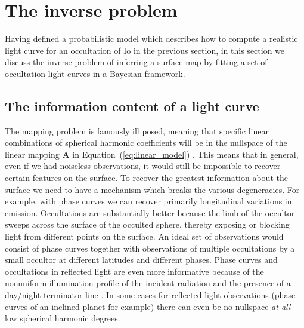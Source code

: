 \documentclass[modern]{aastex62}
\begin{document}
\section{The inverse problem}
\label{sec:inverse_problem}
Having defined a probabilistic model which describes how to compute a realistic light curve for an occultation of Io in the previous section, in this section we discuss the inverse problem of inferring a surface map by fitting a set of occultation light curves in a Bayesian framework.

\subsection{The information content of a light curve}
\label{ssec:information_content}
The mapping problem is famously ill posed, meaning that specific linear combinations of spherical harmonic coefficients will be in the nullspace of the linear mapping  $\mathbf{A}$ in Equation~(\ref{eq:linear_model}) \citep{luger2021}.
This means that in general, even if we had noiseless observations, it would still be impossible to recover certain features on the surface.
To recover the greatest information about the surface we need to have a mechanism which breaks the various degeneracies.
For example, with phase curves we can recover primarily longitudinal variations in emission.
Occultations are substantially better because the limb of the occultor sweeps across the surface of the occulted sphere, thereby exposing or blocking light from different points on the surface.
An ideal set of observations would consist of phase curves together with observations of multiple occultations by a small occultor at different latitudes and different phases.
Phase curves and occultations in reflected light are even more informative because of the nonuniform illumination profile of the incident radiation and the presence of a day/night terminator line \citep[][Luger et al. 2021 in prep]{luger2019a}.
In some cases for reflected light observations (phase curves of an inclined planet for example) there can even be no nullspace \emph{at all} low spherical harmonic degrees.
\end{document}

